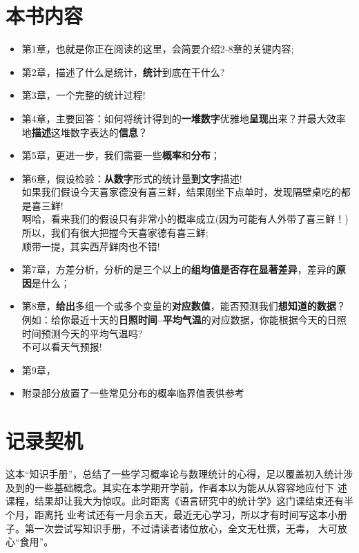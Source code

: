 \documentclass[lang=cn,10pt]{elegantbook}
\begin{document}
\section{本书内容}
\begin{itemize}
  \item 第1章，也就是你正在阅读的这里，会简要介绍2-8章的关键内容;
  \item 第2章，描述了什么是统计，\textbf{统计}到底在干什么?
  \item 第3章，一个完整的统计过程!
  \item 第4章，主要回答：如何将统计得到的\textbf{一堆数字}优雅地\textbf{呈现}出来？并最大效率地\textbf{描述}这堆数字表达的\textbf{信息}？
  \item 第5章，更进一步，我们需要一些\textbf{概率}和\textbf{分布}；
  \item 第6章，假设检验：\textbf{从数字}形式的统计量\textbf{到文字}描述!\\
  如果我们假设今天喜家德没有喜三鲜，结果刚坐下点单时，发现隔壁桌吃的都是喜三鲜!\\
  啊哈，看来我们的假设只有非常小的概率成立(因为可能有人外带了喜三鲜！)\\
  所以，我们有很大把握今天喜家德有喜三鲜;\\
  顺带一提，其实西芹鲜肉也不错!
  \item 第7章，方差分析，分析的是三个以上的\textbf{组均值是否存在显著差异}，差异的\textbf{原因}是什么；
  \item 第8章，\textbf{给出}多组一个或多个变量的\textbf{对应数值}，能否预测我们\textbf{想知道的数据}？\\
  例如：给你最近十天的\textbf{日照时间--平均气温}的对应数据，你能根据今天的日照时间预测今天的平均气温吗?\\
  不可以看天气预报!
  \item 第9章，
  \item 附录部分放置了一些常见分布的概率临界值表供参考
\end{itemize}


\section{记录契机}
这本“知识手册”，总结了一些学习概率论与数理统计的心得，足以覆盖初入统计涉及到的一些基础概念。其实在本学期开学前，作者本以为能从从容容地应付下
述课程，结果却让我大为惊叹。此时距离《语言研究中的统计学》这门课结束还有半个月，距离托
业考试还有一月余五天，最近无心学习，所以才有时间写这本小册子。第一次尝试写知识手册，不过请读者诸位放心，全文无杜撰，无毒，
大可放心“食用”。
\end{document}
